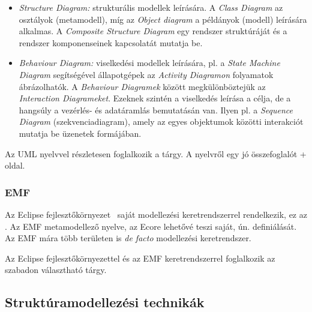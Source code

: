\begin{itemize}
	\item \emph{Structure Diagram:} strukturális modellek leírására. A \emph{Class Diagram} az osztályok (metamodell), míg az \emph{Object diagram} a példányok (modell) leírására alkalmas. A \emph{Composite Structure Diagram} egy rendszer struktúráját és a rendszer komponenseinek kapcsolatát mutatja be.
	\item \emph{Behaviour Diagram:} viselkedési modellek leírására, pl. a \emph{State Machine Diagram} segítségével állapotgépek az \emph{Activity Diagramon} folyamatok ábrázolhatók. A \emph{Behaviour Diagramek} között megkülönböztejük az \emph{Interaction Diagrameket}. Ezeknek szintén a viselkedés leírása a célja, de a hangsúly a vezérlés- és adatáramlás bemutatásán van. Ilyen pl. a \emph{Sequence Diagram} (szekvenciadiagram), amely az egyes objektumok közötti interakciót mutatja be üzenetek formájában.
\end{itemize}


Az UML nyelvvel részletesen foglalkozik a \szofttech tárgy. A nyelvről egy jó összefoglalót \az+\cite{uml-diagrams} oldal.


\subsubsection{EMF}

Az Eclipse fejlesztőkörnyezet~\cite{eclipse} saját modellezési keretrendszerrel rendelkezik, ez az . Az EMF metamodellező nyelve, az Ecore lehetővé teszi saját, ún.  definiálását. Az EMF mára több területen is \emph{de facto} modellezési keretrendszer.

Az Eclipse fejlesztőkörnyezettel és az EMF keretrendszerrel foglalkozik az \eat szabadon választható tárgy.

\subsection{Struktúramodellezési technikák}

